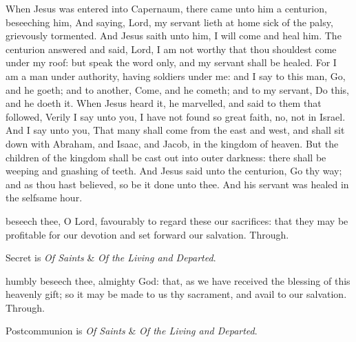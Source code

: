 
 When Jesus was entered into Capernaum, there came unto him a centurion, beseeching him, And saying, Lord, my servant lieth at home sick of the palsy, grievously tormented. And Jesus saith unto him, I will come and heal him. The centurion answered and said, Lord, I am not worthy that thou shouldest come under my roof: but speak the word only, and my servant shall be healed. For I am a man under authority, having soldiers under me: and I say to this man, Go, and he goeth; and to another, Come, and he cometh; and to my servant, Do this, and he doeth it. When Jesus heard it, he marvelled, and said to them that followed, Verily I say unto you, I have not found so great faith, no, not in Israel. And I say unto you, That many shall come from the east and west, and shall sit down with Abraham, and Isaac, and Jacob, in the kingdom of heaven. But the children of the kingdom shall be cast out into outer darkness: there shall be weeping and gnashing of teeth. And Jesus said unto the centurion, Go thy way; and as thou hast believed, so be it done unto thee. And his servant was healed in the selfsame hour.


\secret
{} beseech thee, O Lord, favourably to regard these our sacrifices: that they may be profitable for our devotion and set forward our salvation. Through.

\begin{rubric}
     Secret is \emph{Of Saints} \&  \emph{Of the Living and Departed}.
\end{rubric}


\postcommunion
{} humbly beseech thee, almighty God: that, as we have received the blessing of this heavenly gift; so it may be made to us thy sacrament, and avail to our salvation. Through.

\begin{rubric}
     Postcommunion is \emph{Of Saints} \&  \emph{Of the Living and Departed}.
\end{rubric}

